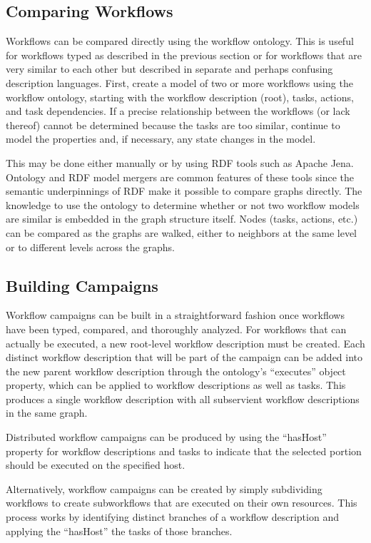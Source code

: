 \subsection{Comparing Workflows}

Workflows can be compared directly using the workflow ontology. This is useful
for workflows typed as described in the previous section or for workflows that
are very similar to each other but described in separate and perhaps confusing
description languages. First, create a model of two or more workflows using the
workflow ontology, starting with the workflow description (root), tasks,
actions, and task dependencies. If a precise relationship between the workflows
(or lack thereof) cannot be determined because the tasks are too similar,
continue to model the properties and, if necessary, any state changes in the
model.

This may be done either manually or by using RDF tools such as Apache Jena.
Ontology and RDF model mergers are common features of these tools since the
semantic underpinnings of RDF make it possible to compare graphs directly. The
knowledge to use the ontology to determine whether or not two workflow models
are similar is embedded in the graph structure itself. Nodes
(tasks, actions, etc.) can be compared as the graphs are walked, either to
neighbors at the same level or to different levels across the graphs.

\subsection{Building Campaigns}

Workflow campaigns can be built in a straightforward fashion once workflows have
been typed, compared, and thoroughly analyzed. For workflows that can actually
be executed, a new root-level workflow description must be created. Each
distinct workflow description that will be part of the campaign can be added
into the new parent workflow description through the ontology's
``executes'' object property, which can be applied to workflow descriptions as
well as tasks. This produces a single workflow description with all subservient
workflow descriptions in the same graph.

Distributed workflow campaigns can be produced by using the ``hasHost'' property
for workflow descriptions and tasks to indicate that the selected portion should
be executed on the specified host.

Alternatively, workflow campaigns can be created by simply subdividing
workflows to create subworkflows that are executed on their own resources. This
process works by identifying distinct branches of a workflow description and
applying the ``hasHost'' the tasks of those branches. 

